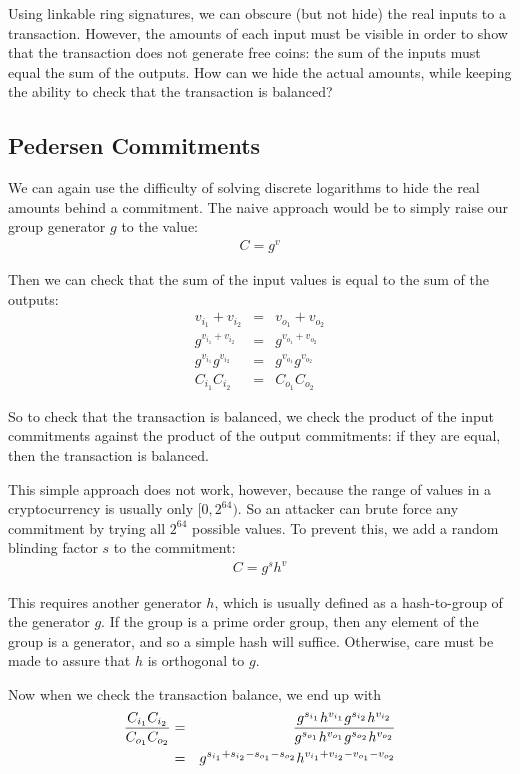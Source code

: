 \documentclass{article}
\begin{document}
Using linkable ring signatures, we can obscure (but not hide) the real inputs to a transaction.  However, the amounts of each input must be visible in order to show that the transaction does not generate free coins: the sum of the inputs must equal the sum of the outputs.  How can we hide the actual amounts, while keeping the ability to check that the transaction is balanced?


\subsection{Pedersen Commitments}

We can again use the difficulty of solving discrete logarithms to hide the real amounts behind a commitment.  The naive approach would be to simply raise our group generator $g$ to the value:
\begin{eqnarray}
  C=g^v
\end{eqnarray}

Then we can check that the sum of the input values is equal to the sum of the outputs:
\begin{eqnarray}
  v_{i_1} + v_{i_2} &=& v_{o_1} + v_{o_2}\\
  g^{v_{i_1} + v_{i_2}} &=& g^{v_{o_1} + v_{o_2}}\\
  g^{v_{i_1}} g^{v_{i_2}} &=& g^{v_{o_1}} g^{v_{o_2}}\\
  C_{i_1} C_{i_2} &=& C_{o_1} C_{o_2}
\end{eqnarray}
  
So to check that the transaction is balanced, we check the product of the input commitments against the product of the output commitments: if they are equal, then the transaction is balanced.

This simple approach does not work, however, because the range of values in a cryptocurrency is usually only $[0, 2^{64})$.  So an attacker can brute force any commitment by trying all $2^{64}$ possible values.  To prevent this, we add a random blinding factor $s$ to the commitment:
\begin{eqnarray}
  C = g^s h^v
\end{eqnarray}
  
This requires another generator $h$, which is usually defined as a hash-to-group of the generator $g$.  If the group is a prime order group, then any element of the group is a generator, and so a simple hash will suffice.  Otherwise, care must be made to assure that $h$ is orthogonal to $g$.

Now when we check the transaction balance, we end up with
\begin{eqnarray}
  \frac{C_{i_1} C_{i_2}}{C_{o_1} C_{o_2}} &=& \frac{g^{s_{i_1}} h^{v_{i_1}} g^{s_{i_2}} h^{v_{i_2}}}{g^{s_{o_1}} h^{v_{o_1}} g^{s_{o_2}} h^{v_{o_2}}}
  \cr &=& g^{s_{i_1} + s_{i_2} - s_{o_1} - s_{o_2}} h^{v_{i_1} + v_{i_2} - v_{o_1} - v_{o_2}}
\end{eqnarray}
\end{document}
